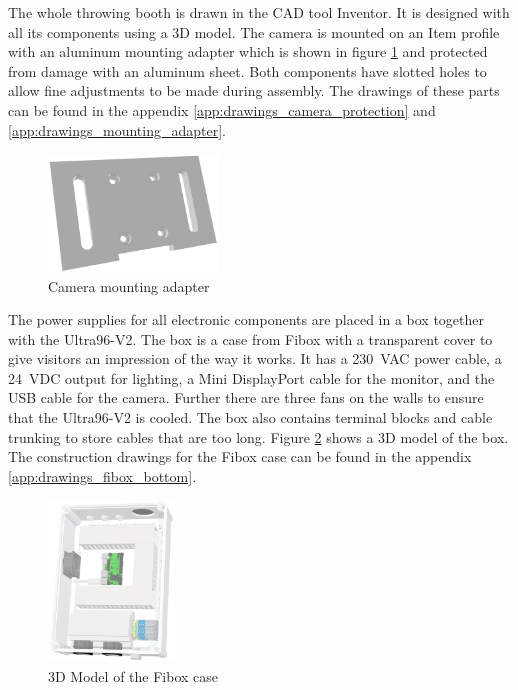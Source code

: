 The whole throwing booth is drawn in the CAD tool Inventor. It is designed with all its components using a 3D model.
The camera is mounted on an Item profile with an aluminum mounting adapter which is shown in figure \ref{fig:mounting_adapter} and protected from damage with an aluminum sheet.
Both components have slotted holes to allow fine adjustments to be made during assembly.
The drawings of these parts can be found in the appendix \ref{app:drawings_camera_protection} and \ref{app:drawings_mounting_adapter}.

\begin{figure}[h]
	\centering
	\includegraphics[width=0.4\textwidth]{graphics/mounting_adapter.png}
	\caption{Camera mounting adapter}
	\label{fig:mounting_adapter}
\end{figure}

The power supplies for all electronic components are placed in a box together with the Ultra96-V2.
The box is a case from Fibox with a transparent cover to give visitors an impression of the way it works.
It has a \SI{230}{VAC} power cable, a \SI{24}{VDC} output for lighting, a Mini DisplayPort cable for the monitor, and the USB cable for the camera.
Further there are three fans on the walls to ensure that the Ultra96-V2 is cooled.
The box also contains terminal blocks and cable trunking to store cables that are too long.
Figure \ref{fig:fibox3d} shows a 3D model of the box. The construction drawings for the Fibox case can be found in the appendix \ref{app:drawings_fibox_bottom}.

\begin{figure}[h]
	\centering
	\includegraphics[width=0.3\textwidth]{graphics/case.png}
	\caption{3D Model of the Fibox case}
	\label{fig:fibox3d}
\end{figure}
